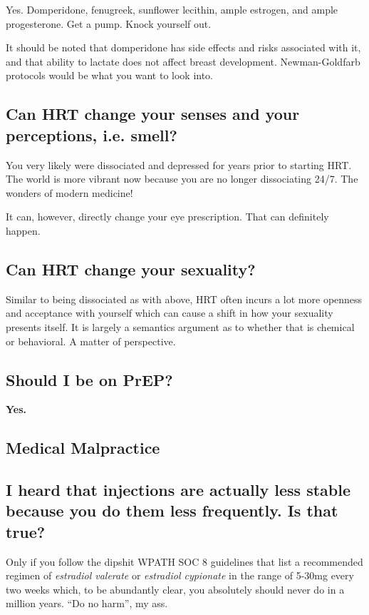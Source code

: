 \documentclass{article}
\begin{document}
{{Yes. Domperidone, fenugreek, sunflower lecithin, ample estrogen, and ample progesterone. Get a pump. Knock yourself out.

It should be noted that domperidone has side effects and risks associated with it, and that ability to lactate does not affect breast development. Newman-Goldfarb protocols would be what you want to look into.

\subsection{Can HRT change your senses and your perceptions, i.e. smell?}

You very likely were dissociated and depressed for years prior to starting HRT. The world is more vibrant now because you are no longer dissociating 24/7. The wonders of modern medicine!

It can, however, directly change your eye prescription. That can definitely happen.

\subsection{Can HRT change your sexuality?}

Similar to being dissociated as with above, HRT often incurs a lot more openness and acceptance with yourself which can cause a shift in how your sexuality presents itself. It is largely a semantics argument as to whether that is chemical or behavioral. A matter of perspective. 

\subsection{Should I be on PrEP?}

\textbf{Yes.}

\subsection*{Medical Malpractice}

\subsection{I heard that injections are actually less stable because you do them less frequently. Is that true?}

Only if you follow the dipshit WPATH SOC 8 guidelines that list a recommended regimen of \textit{estradiol valerate} or \textit{estradiol cypionate} in the range of 5-30mg every two weeks which, to be abundantly clear, you absolutely should never do in a million years. “Do no harm”, my ass. 

}}
\end{document}
